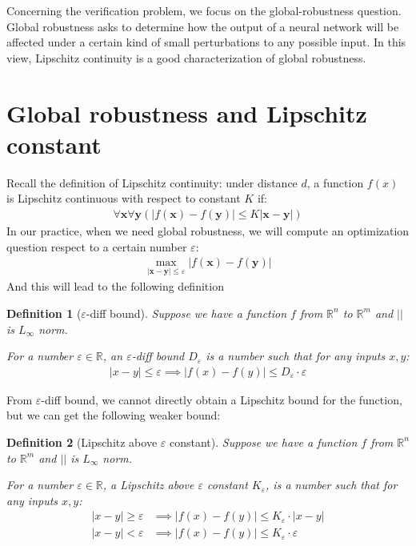\documentclass[letterpaper]{article} %
\newtheorem{definition}{Definition}
\begin{document}
	Concerning the verification problem, we focus on the global-robustness question. Global robustness asks to determine how the output of a neural network will be affected under a certain kind of small perturbations to any possible input. In this view, Lipschitz continuity is a good characterization of global robustness.
	
	
	
	
	
	\section{Global robustness and Lipschitz constant}
	
	
	Recall the definition of Lipschitz continuity:
	under distance $d$, a function $f(x)$ is Lipschitz continuous with respect to constant $K$ if:
	\begin{align*}
		\forall \boldsymbol{x} \forall\boldsymbol{y} (|f(\boldsymbol{x}) -f(\boldsymbol{y}) |\leq K|\boldsymbol{x}-\boldsymbol{y}|)
	\end{align*} 
	In our practice, when we need global robustness, we will compute an optimization question respect to a certain number $\varepsilon$:	\begin{align}\label{global_robustness}
		\max_{|\boldsymbol{x}-\boldsymbol{y}| \leq \varepsilon} |f(\boldsymbol{x}) -f(\boldsymbol{y}) |
	\end{align} And this will lead to the following definition
	
	\begin{definition}[$\varepsilon$-diff bound]
		Suppose we have a function $f$ from $\mathbb{R}^n$ to $\mathbb{R}^m$ and $||$ is $L_\infty$ norm. 
		
		For a number $\varepsilon\in\mathbb{R}$, an $\varepsilon$-diff bound $D_\varepsilon$ is a number such that for any inputs $x,y$: \begin{align*}
			|x-y|\leq \varepsilon \implies |f(x)-f(y)| \leq D_\varepsilon \cdot \varepsilon
		\end{align*}
		
	\end{definition}
	
	From $\varepsilon$-diff bound, we cannot directly obtain a Lipschitz bound for the function, but we can get the following weaker bound:
	
	\begin{definition}[Lipschitz above $\varepsilon$ constant]
		Suppose we have a function $f$ from $\mathbb{R}^n$ to $\mathbb{R}^m$ and $||$ is $L_\infty$ norm. 
		
		For a number $\varepsilon\in\mathbb{R}$, a Lipschitz above $\varepsilon$ constant  $K_\varepsilon$,  is a number such that for any inputs $x,y$: \begin{align*}
			|x-y|\geq \varepsilon &\implies |f(x)-f(y)| \leq K_\varepsilon \cdot |x-y|\\
			|x-y|<\varepsilon &\implies |f(x)-f(y)| \leq K_\varepsilon \cdot \varepsilon\\
		\end{align*}		
	\end{definition}
	
\end{document}
